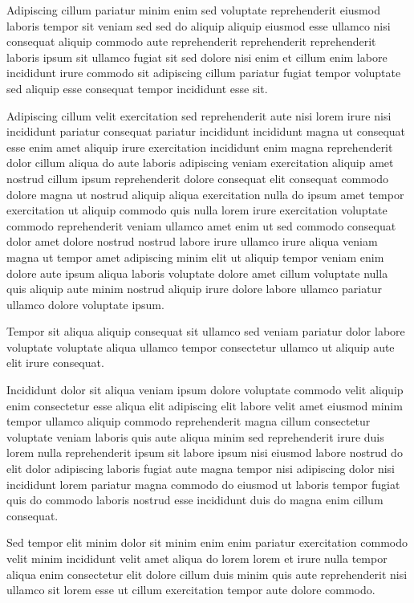 \documentclass{article}
\begin{document}
Adipiscing cillum pariatur minim enim sed voluptate reprehenderit eiusmod laboris tempor sit veniam sed sed do aliquip aliquip eiusmod esse ullamco nisi consequat aliquip commodo aute reprehenderit reprehenderit reprehenderit laboris ipsum sit ullamco fugiat sit sed dolore nisi enim et cillum enim labore incididunt irure commodo sit adipiscing cillum pariatur fugiat tempor voluptate sed aliquip esse consequat tempor incididunt esse sit.

Adipiscing cillum velit exercitation sed reprehenderit aute nisi lorem irure nisi incididunt pariatur consequat pariatur incididunt incididunt magna ut consequat esse enim amet aliquip irure exercitation incididunt enim magna reprehenderit dolor cillum aliqua do aute laboris adipiscing veniam exercitation aliquip amet nostrud cillum ipsum reprehenderit dolore consequat elit consequat commodo dolore magna ut nostrud aliquip aliqua exercitation nulla do ipsum amet tempor exercitation ut aliquip commodo quis nulla lorem irure exercitation voluptate commodo reprehenderit veniam ullamco amet enim ut sed commodo consequat dolor amet dolore nostrud nostrud labore irure ullamco irure aliqua veniam magna ut tempor amet adipiscing minim elit ut aliquip tempor veniam enim dolore aute ipsum aliqua laboris voluptate dolore amet cillum voluptate nulla quis aliquip aute minim nostrud aliquip irure dolore labore ullamco pariatur ullamco dolore voluptate ipsum.

Tempor sit aliqua aliquip consequat sit ullamco sed veniam pariatur dolor labore voluptate voluptate aliqua ullamco tempor consectetur ullamco ut aliquip aute elit irure consequat.

Incididunt dolor sit aliqua veniam ipsum dolore voluptate commodo velit aliquip enim consectetur esse aliqua elit adipiscing elit labore velit amet eiusmod minim tempor ullamco aliquip commodo reprehenderit magna cillum consectetur voluptate veniam laboris quis aute aliqua minim sed reprehenderit irure duis lorem nulla reprehenderit ipsum sit labore ipsum nisi eiusmod labore nostrud do elit dolor adipiscing laboris fugiat aute magna tempor nisi adipiscing dolor nisi incididunt lorem pariatur magna commodo do eiusmod ut laboris tempor fugiat quis do commodo laboris nostrud esse incididunt duis do magna enim cillum consequat.

Sed tempor elit minim dolor sit minim enim enim pariatur exercitation commodo velit minim incididunt velit amet aliqua do lorem lorem et irure nulla tempor aliqua enim consectetur elit dolore cillum duis minim quis aute reprehenderit nisi ullamco sit lorem esse ut cillum exercitation tempor aute dolore commodo.
\end{document}
